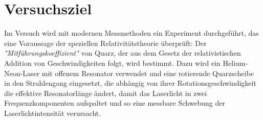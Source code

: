 \section{Versuchsziel}
Im Versuch wird mit modernen Messmethoden ein Experiment durchgeführt,
das eine Voraussage der speziellen Relativitätstheorie überprüft:
Der \emph{"Mitführungskoeffizient"} von Quarz,
der aus dem Gesetz der relativistischen Addition von Geschwindigkeiten folgt, wird bestimmt.
Dazu wird ein Helium-Neon-Laser mit offenem Resonator verwendet und
eine rotierende Quarzscheibe in den Strahlengang eingesetzt,
die abhängig von ihrer Rotationsgeschwindigkeit die effektive Resonatorlänge ändert,
damit das Laserlicht in zwei Frequenzkomponenten aufspaltet und
so eine messbare Schwebung der Laserlichtintensität verursacht.
